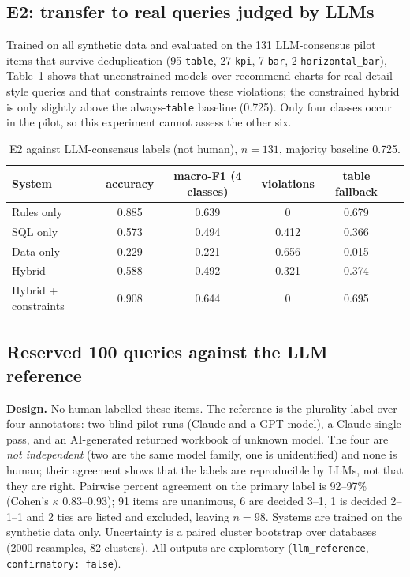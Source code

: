 \documentclass[11pt]{article}
\newcommand{\sql}[1]{\texttt{#1}}
\begin{document}
\subsection{E2: transfer to real queries judged by LLMs}
Trained on all synthetic data and evaluated on the 131 LLM-consensus pilot items that survive deduplication (95 \sql{table}, 27 \sql{kpi}, 7 \sql{bar}, 2 \sql{horizontal\_bar}), Table~\ref{tab:e2} shows that unconstrained models over-recommend charts for real detail-style queries and that constraints remove these violations; the constrained hybrid is only slightly above the always-\sql{table} baseline (0.725). Only four classes occur in the pilot, so this experiment cannot assess the other six.
\begin{table}[h]\centering\small
\begin{tabular}{lccccc}\toprule
System & accuracy & macro-F1 (4 classes) & violations & table fallback\\\midrule
Rules only & 0.885 & 0.639 & 0 & 0.679\\
SQL only & 0.573 & 0.494 & 0.412 & 0.366\\
Data only & 0.229 & 0.221 & 0.656 & 0.015\\
Hybrid & 0.588 & 0.492 & 0.321 & 0.374\\
Hybrid + constraints & 0.908 & 0.644 & 0 & 0.695\\\bottomrule
\end{tabular}
\caption{E2 against LLM-consensus labels (not human), $n=131$, majority baseline 0.725.}\label{tab:e2}
\end{table}

\subsection{Reserved 100 queries against the LLM reference}\label{sec:llmref}
\textbf{Design.} No human labelled these items. The reference is the plurality label over four annotators: two blind pilot runs (Claude and a GPT model), a Claude single pass, and an AI-generated returned workbook of unknown model. The four are \emph{not independent} (two are the same model family, one is unidentified) and none is human; their agreement shows that the labels are reproducible by LLMs, not that they are right. Pairwise percent agreement on the primary label is 92--97\% (Cohen's $\kappa$ 0.83--0.93); 91 items are unanimous, 6 are decided 3--1, 1 is decided 2--1--1 and 2 ties are listed and excluded, leaving $n=98$. Systems are trained on the synthetic data only. Uncertainty is a paired cluster bootstrap over databases (2000 resamples, 82 clusters). All outputs are exploratory (\texttt{llm\_reference}, \texttt{confirmatory: false}).
\end{document}
